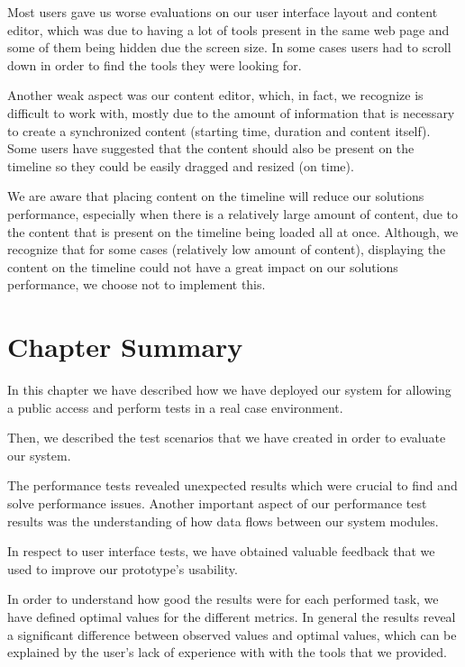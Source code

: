 Most users gave us worse evaluations on our user interface layout and content editor, which was due to having a lot of tools present in the same web page and some of them being hidden due the screen size. In some cases users had to scroll down in order to find the tools they were looking for. 

Another weak aspect was our content editor, which, in fact, we recognize is difficult to work with, mostly due to the amount of information that is necessary to create a synchronized content (starting time, duration and content itself). Some users have suggested that the content should also be present on the timeline so they could be easily dragged and resized (on time).

We are aware that placing content on the timeline will reduce our solutions performance, especially when there is a relatively large amount of content, due to the content that is present on the timeline being loaded all at once. Although, we recognize that for some cases (relatively low amount of content), displaying the content on the timeline could not have a great impact on our solutions performance, we choose not to implement this.



\section{Chapter Summary}
\label{evaluation:summary}

In this chapter we have described how we have deployed our system for allowing a public access and perform tests in a real case environment.
 
Then, we described the test scenarios that we have created in order to evaluate our system. 

The performance tests revealed unexpected results which were crucial to find and solve performance issues. Another important aspect of our performance test results was the understanding of how data flows between our system modules.

In respect to user interface tests, we have obtained valuable feedback that we used to improve our prototype's usability. 

In order to understand how good the results were for each performed task, we have defined optimal values for the different metrics. In general the results reveal a significant difference between observed values and optimal values, which can be explained by the user's lack of experience with with the tools that we provided.